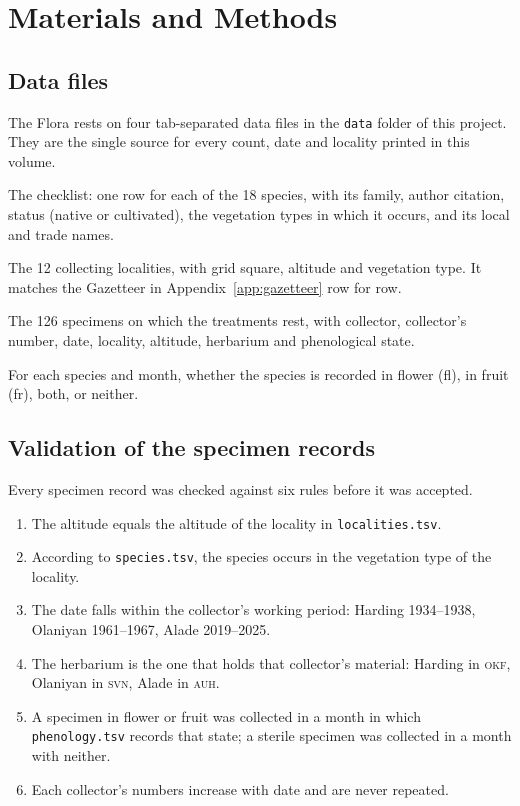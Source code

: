 \chapter{Materials and Methods}

\section{Data files}
The Flora rests on four tab-separated data files in the \texttt{data}
folder of this project. They are the single source for every count,
date and locality printed in this volume.

\begin{description}[style=nextline,leftmargin=2em]
	\item[\texttt{data/species.tsv}] The checklist: one row for each of
	the 18 species, with its family, author citation, status (native or
	cultivated), the vegetation types in which it occurs, and its local
	and trade names.
	\item[\texttt{data/localities.tsv}] The 12 collecting localities, with
	grid square, altitude and vegetation type. It matches the Gazetteer
	in Appendix~\ref{app:gazetteer} row for row.
	\item[\texttt{data/specimens.tsv}] The 126 specimens on which the
	treatments rest, with collector, collector's number, date, locality,
	altitude, herbarium and phenological state.
	\item[\texttt{data/phenology.tsv}] For each species and month, whether
	the species is recorded in flower (fl), in fruit (fr), both, or
	neither.
\end{description}

\section{Validation of the specimen records}
Every specimen record was checked against six rules before it was
accepted.
\begin{enumerate}[label=\arabic*.]
	\item The altitude equals the altitude of the locality in
	\texttt{localities.tsv}.
	\item According to \texttt{species.tsv}, the species occurs in the
	vegetation type of the locality.
	\item The date falls within the collector's working period: Harding
	1934--1938, Olaniyan 1961--1967, Alade 2019--2025.
	\item The herbarium is the one that holds that collector's material:
	Harding in \textsc{okf}, Olaniyan in \textsc{svn}, Alade in
	\textsc{auh}.
	\item A specimen in flower or fruit was collected in a month in which
	\texttt{phenology.tsv} records that state; a sterile specimen was
	collected in a month with neither.
	\item Each collector's numbers increase with date and are never
	repeated.
\end{enumerate}


